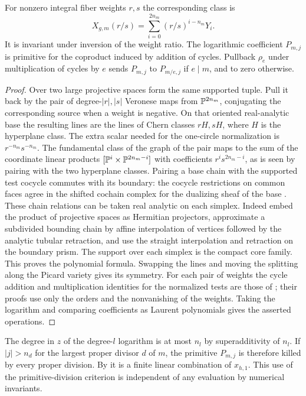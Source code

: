 \begin{lemma}\label{lem:weights}
For nonzero integral fiber weights $r,s$ the corresponding class is
\[
               X_{g,m}(r/s)=\sum_{i=0}^{2n_m}(r/s)^{i-n_m}Y_i .
\]
It is invariant under inversion of the weight ratio. The logarithmic
coefficient $P_{m,j}$ is primitive for the coproduct induced by addition
of cycles. Pullback $\rho_e$ under multiplication of cycles by $e$
sends $P_{m,j}$ to $P_{m/e,j}$ if $e\mid m$, and to zero otherwise.
\end{lemma}
\begin{proof}
Over two large projective spaces form the same supported tuple.
Pull it back by the pair of degree-$|r|,|s|$ Veronese maps from
$\mathbb P^{2n_m}$, conjugating the corresponding source when a weight is
negative. On that oriented real-analytic base the resulting lines are
the lines of Chern classes $rH,sH$, where $H$ is the hyperplane
class. The extra scalar needed for the one-circle normalization is
$r^{-n_m}s^{-n_m}$. The fundamental class of the graph of the pair
maps to the sum of the coordinate linear products
$[\mathbb P^i\times\mathbb P^{2n_m-i}]$ with coefficients $r^is^{2n_m-i}$,
as is seen by pairing with the two hyperplane classes. Pairing a base
chain with the supported test cocycle commutes with its boundary:
the cocycle restrictions on common faces agree in the shifted
cochain complex for the dualizing sheaf of the base
\cite[\S2.4 and Remark~3.6]{Pardon}. These chain relations can be
taken real analytic on each simplex. Indeed embed the product of
projective spaces as Hermitian projectors, approximate a subdivided
bounding chain by affine interpolation of vertices followed by the
analytic tubular retraction, and use the straight interpolation and
retraction on the boundary prism. The support over each simplex is
the compact core family. This proves the polynomial formula. Swapping
the lines and moving the splitting along the Picard variety gives
its symmetry. For each pair of weights the cycle addition and
multiplication identities for the normalized tests are those of
\cite[\S3]{WueBalanced}; their proofs use only the orders and the
nonvanishing of the weights. Taking the logarithm and comparing
coefficients as Laurent polynomials gives the asserted operations.
\end{proof}

The degree in $z$ of the degree-$l$ logarithm is at most $n_l$ by
superadditivity of $n_l$. If $|j|>n_d$ for the largest proper divisor
$d$ of $m$, the primitive $P_{m,j}$ is therefore killed by every
proper division. By \cite[Lemma~7.1]{WueProduct} it is a finite linear
combination of $x_{h,1}$. This use of the primitive-division criterion
is independent of any evaluation by numerical invariants.

